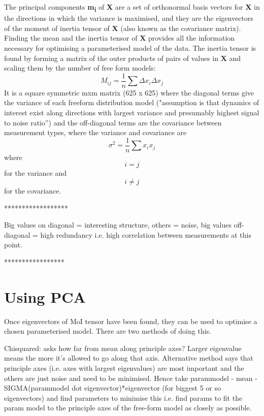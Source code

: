\documentclass{article}
\begin{document}
The principal components \textbf{m\textsubscript{i}} of \textbf{X} are a set of orthonormal basis vectors for \textbf{X} in the directions in which the variance is maximised, and they are the eigenvectors of the moment of inertia tensor of \textbf{X} (also known as the covariance matrix). Finding the mean and the inertia tensor of \textbf{X} provides all the information necessary for optimising a parameterised model of the data.
The inertia tensor is found by forming a matrix of the outer products of pairs of values in \textbf{X} and scaling them by the number of free form models:
\begin{equation}
M_{ij} = \frac{1}{n}\sum\nolimits \Delta x_i \Delta x_j
\end{equation}
It is a square symmetric mxm matrix (625 x 625) where the diagonal terms give the variance of each freeform distribution model ("assumption is that dynamics of interest exist along directions with largest variance and presumably highest signal to noise ratio”) and the off-diagonal terms are the covariance between measurement types, where the variance and covariance are
\begin{equation*}
\sigma^2 = \frac{1}{n}\sum\nolimits x_i x_j
\end{equation*}
where \begin{equation*} i = j \end{equation*} for the variance and \begin{equation*} i \neq j \end{equation*} for the covariance.


******************

Big values on diagonal = interesting structure, others = noise, big values off-diagonal = high redundancy i.e. high correlation between measurements at this point.

*****************


\section{Using PCA}
Once eigenvectors of MoI tensor have been found, they can be used to optimise a chosen parameterised model. There are two methods of doing this.

Chisquared: asks how far from mean along principle axes? Larger eigenvalue means the more it's allowed to go along that axis. 
Alternative method says that principle axes (i.e. axes with largest eigenvalues) are most important and the others are just noise and need to be minimised. Hence take parammodel - mean - SIGMA(parammodel dot eigenvector)*eigenvector (for biggest 5 or so eigenvectors) and find parameters to minimise this i.e. find params to fit the param model to the principle axes of the free-form model as closely as possible.
\end{document}
